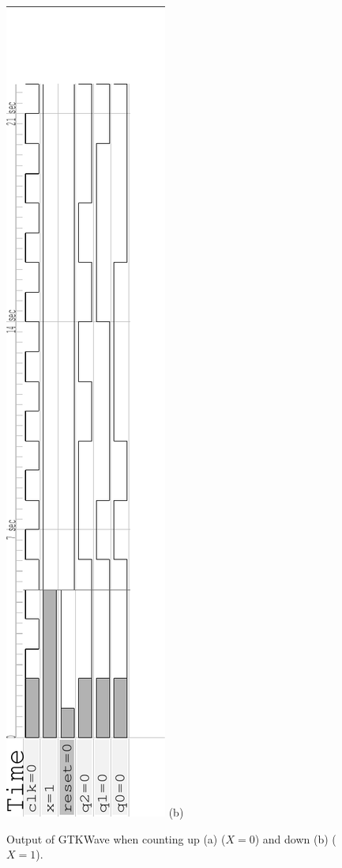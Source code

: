 \documentclass[12pt]{article}
\begin{document}
\begin{figure}
\includegraphics[angle=-90,scale=0.7]{verilog/3bitcounter-down}
(b)
\caption{Output of GTKWave when counting up (a) ($X = 0$) and
down (b) ($X = 1$).}
\label{fig:wave}
\end{figure}
\end{document}
